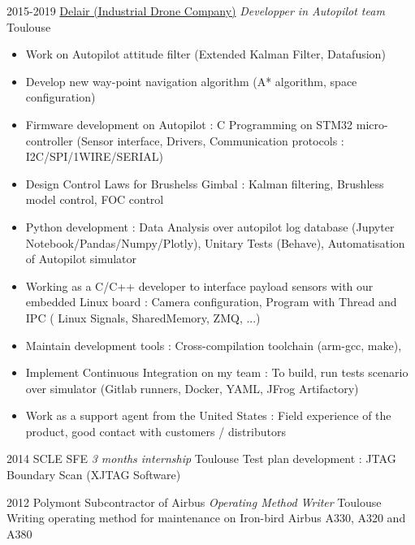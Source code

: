 \documentclass[a4paper]{friggeri-cv} %
\begin{document}
\begin{entrylist}
\entry
{2015-2019}
{\href{https://delair.aero}{Delair (Industrial Drone Company)} \textit{ Developper in Autopilot team}}
{Toulouse}
{
\begin{itemize}
\item Work on Autopilot attitude filter (Extended Kalman Filter, Datafusion)
\item Develop new way-point navigation algorithm (A* algorithm, space configuration)
\item Firmware development on Autopilot : C Programming on
	STM32 micro-controller (Sensor interface, Drivers, Communication protocols : I2C/SPI/1WIRE/SERIAL)
\item Design Control Laws for Brushelss Gimbal : Kalman filtering, Brushless model control, FOC control
\item Python development : Data Analysis over autopilot log database (Jupyter Notebook/Pandas/Numpy/Plotly), Unitary Tests (Behave), Automatisation of Autopilot simulator
\item Working as a C/C++ developer to interface payload sensors with our embedded Linux board : Camera configuration, Program with Thread and IPC (  Linux Signals, SharedMemory, ZMQ, ...)
\item Maintain development tools : Cross-compilation toolchain (arm-gcc, make), 
\item Implement Continuous Integration on my team : To build, run tests scenario over simulator (Gitlab runners, Docker, YAML, JFrog Artifactory) 
\item Work as a support agent from the United States : Field experience of the
	product, good contact with customers / distributors
\end{itemize}
%
}
\entry
{2014}
{SCLE SFE \textit{3 months internship}}
{Toulouse}
{Test plan development : JTAG Boundary Scan (XJTAG Software)
}

\entry
{2012}
{Polymont Subcontractor of Airbus \textit{Operating Method Writer}}
{Toulouse}
{ Writing operating method for maintenance on Iron-bird Airbus A330, A320 and A380 }


\end{entrylist}

\end{document}
